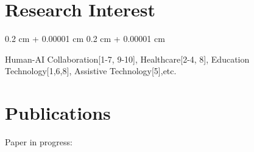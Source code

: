 \documentclass[10pt, letterpaper]{article}
\newenvironment{onecolentry}{
    \begin{adjustwidth}{
        0.2 cm + 0.00001 cm
    }{
        0.2 cm + 0.00001 cm
    }
}{
    \end{adjustwidth}
} %
\begin{document}
    \section{Research Interest}

        \begin{onecolentry}
            Human-AI Collaboration[1-7, 9-10], Healthcare[2-4, 8], Education Technology[1,6,8], Assistive Technology[5],etc.

        \end{onecolentry}

    \section{Publications}
        Paper in progress:
\end{document}
